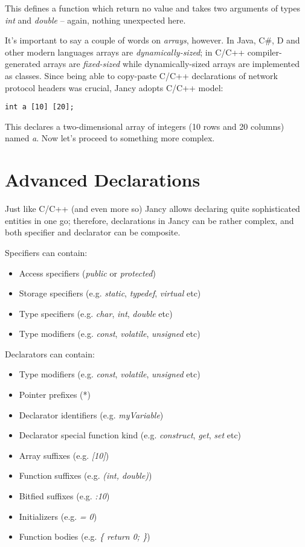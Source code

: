 \documentclass[oneside]{book}
\begin{document}
This defines a function which return no value and takes two arguments of types \emph{int} and \emph{double} -- again, nothing unexpected here.

It's important to say a couple of words on \emph{arrays}, however. In Java, C\#, D and other modern languages arrays are \emph{dynamically-sized}; in C/C++ compiler-generated arrays are \emph{fixed-sized} while dynamically-sized arrays are implemented as classes. Since being able to copy-paste C/C++ declarations of network protocol headers was crucial, Jancy adopts C/C++ model:

\begin{lstlisting}
int a [10] [20];
\end{lstlisting}

This declares a two-dimensional array of integers (10 rows and 20 columns) named \emph{a}. Now let's proceed to something more complex.

\section{Advanced Declarations}

Just like C/C++ (and even more so) Jancy allows declaring quite sophisticated entities in one go; therefore, declarations in Jancy can be rather complex, and both specifier and declarator can be composite. 

Specifiers can contain:
\begin{itemize}
\item Access specifiers (\emph{public} or \emph{protected})
\item Storage specifiers (e.g. \emph{static}, \emph{typedef}, \emph{virtual} etc)
\item Type specifiers (e.g. \emph{char}, \emph{int}, \emph{double} etc)
\item Type modifiers (e.g. \emph{const}, \emph{volatile}, \emph{unsigned} etc)
\end{itemize}

Declarators can contain:
\begin{itemize}
\item Type modifiers (e.g. \emph{const}, \emph{volatile}, \emph{unsigned} etc)
\item Pointer prefixes (*)
\item Declarator identifiers (e.g. \emph{myVariable})
\item Declarator special function kind (e.g. \emph{construct}, \emph{get}, \emph{set} etc)
\item Array suffixes (e.g. \emph{[10]})
\item Function suffixes (e.g. \emph{(int, double)})
\item Bitfied suffixes (e.g. \emph{:10})
\item Initializers (e.g. \emph{= 0})
\item Function bodies  (e.g. \emph{\{ return 0; \}})
\end{itemize}
\end{document}
